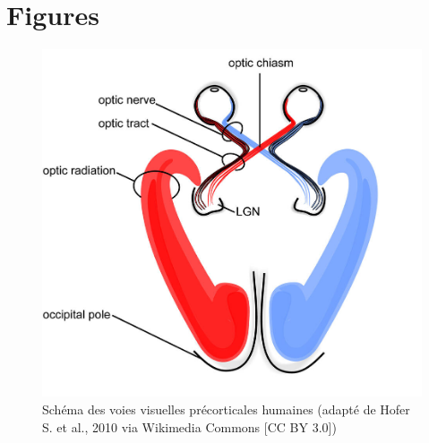 
\chapter{Figures} %

\label{Figures} %


\begin{figure}[th]
\centering
\includegraphics{Figures/visual_system}
\decoRule %
\caption[Figure]{Schéma des voies visuelles précorticales humaines (adapté de Hofer S. et al., 2010 via Wikimedia Commons [CC BY 3.0])}
\label{fig:visual_system}
\end{figure}


